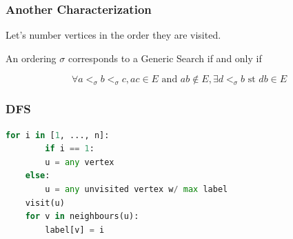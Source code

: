 \documentclass{beamer}
\begin{document}
\begin{frame}\frametitle{Another Characterization}
    Let's number vertices in the order they are visited.
    \begin{theorem}
        An ordering $\sigma$ corresponds to a Generic Search if and only if
	    
	    $$\forall a <_{\sigma} b <_{\sigma} c, ac \in E\text{ and }ab \notin E, \exists d <_{\sigma} b\text{ st }db \in E$$
    \end{theorem}
    \begin{center}
    \end{center}
\end{frame}




\begin{frame}[fragile]\frametitle{DFS}
    \begin{lstlisting}[language = Python]
    for i in [1, ..., n]:
        if i == 1:
	    u = any vertex
	else:
	    u = any unvisited vertex w/ max label
	visit(u)
	for v in neighbours(u):
	    label[v] = i
    \end{lstlisting}
\end{frame}
\end{document}
